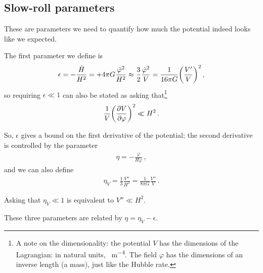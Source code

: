 \documentclass[main.tex]{subfiles}
\begin{document}
\subsection{Slow-roll parameters}

These are parameters we need to quantify how much the potential indeed looks like we expected. 

The first parameter we define is
%
\begin{align}
\epsilon 
= - \frac{\dot{H}}{H^2} = 
+ 4 \pi G \frac{\dot{\varphi}^2}{H^2} \approx \frac{3}{2} \frac{\dot{\varphi}^2}{V} = \frac{1}{16 \pi G} \qty(\frac{V'}{V})^2
\,,
\end{align}
%
so requiring \(\epsilon \ll 1\) can also be stated as asking that\footnote{A note on the dimensionality: the potential \(V\) has the dimensions of the Lagrangian: in natural units, \SI{}{m^{-4}}. The field \(\varphi \) has the dimensions of an inverse length (a mass), just like the Hubble rate.}
%
\begin{align}
\frac{1}{V} \qty(\pdv{V}{\varphi })^2 \ll H^2
\,.
\end{align}

So, \(\epsilon \) gives a bound on the first derivative of the potential; the second derivative is controlled by the parameter 
%
\begin{align}
\eta = - \frac{\ddot{\varphi}}{H \dot{\varphi}
}
\,,
\end{align}
%
and we can also define 
%
\begin{align}
\eta _V = \frac{1}{3} \frac{V''}{H^2} = \frac{1}{8 \pi G} \frac{V''}{V}
\,.
\end{align}

Asking that \(\eta _V \ll 1 \) is equivalent to \(V'' \ll H^2\). 

These three parameters are related by \(\eta = \eta _V - \epsilon \).
\end{document}
